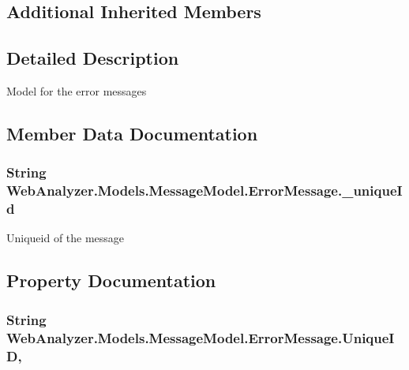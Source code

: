 \subsection*{Additional Inherited Members}


\subsection{Detailed Description}
Model for the error messages 



\subsection{Member Data Documentation}
\hypertarget{class_web_analyzer_1_1_models_1_1_message_model_1_1_error_message_a06154fcc80f03446f4ed2a4e82ac6bd3}{}
\subsubsection[{\+\_\+unique\+Id}]{\setlength{\rightskip}{0pt plus 5cm}String Web\+Analyzer.\+Models.\+Message\+Model.\+Error\+Message.\+\_\+unique\+Id\hspace{0.3cm}{\ttfamily [private]}}\label{class_web_analyzer_1_1_models_1_1_message_model_1_1_error_message_a06154fcc80f03446f4ed2a4e82ac6bd3}


Uniqueid of the message 



\subsection{Property Documentation}
\hypertarget{class_web_analyzer_1_1_models_1_1_message_model_1_1_error_message_a795e90650dd234f29a110e27643828e2}{}
\subsubsection[{Unique\+I\+D}]{\setlength{\rightskip}{0pt plus 5cm}String Web\+Analyzer.\+Models.\+Message\+Model.\+Error\+Message.\+Unique\+I\+D\hspace{0.3cm}{\ttfamily [get]}, {\ttfamily [set]}}\label{class_web_analyzer_1_1_models_1_1_message_model_1_1_error_message_a795e90650dd234f29a110e27643828e2}



